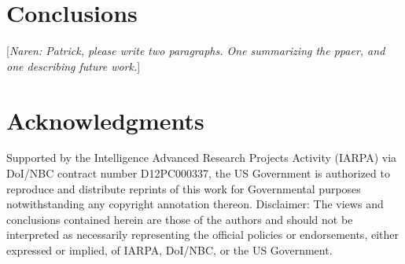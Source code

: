 \documentclass{sig-alternate-05-2015}
\newcommand{\narenc}[1]{[{\color{red}\textit{Naren}\textit{: #1}}]}
\begin{document}









%

%

\section{Conclusions}
\narenc{Patrick, please write two paragraphs. One summarizing the ppaer, and one describing future work.}

\section*{Acknowledgments}
{\small Supported by the Intelligence Advanced Research Projects Activity (IARPA) via
DoI/NBC contract number D12PC000337, the US Government is authorized to reproduce and distribute reprints of
this work for Governmental purposes notwithstanding any copyright annotation thereon.
Disclaimer: The views and conclusions contained herein are
those of the authors and should not be interpreted as necessarily
representing the official policies or endorsements, either expressed or
implied, of IARPA, DoI/NBC, or the US Government.
}

%
%
\end{document}
